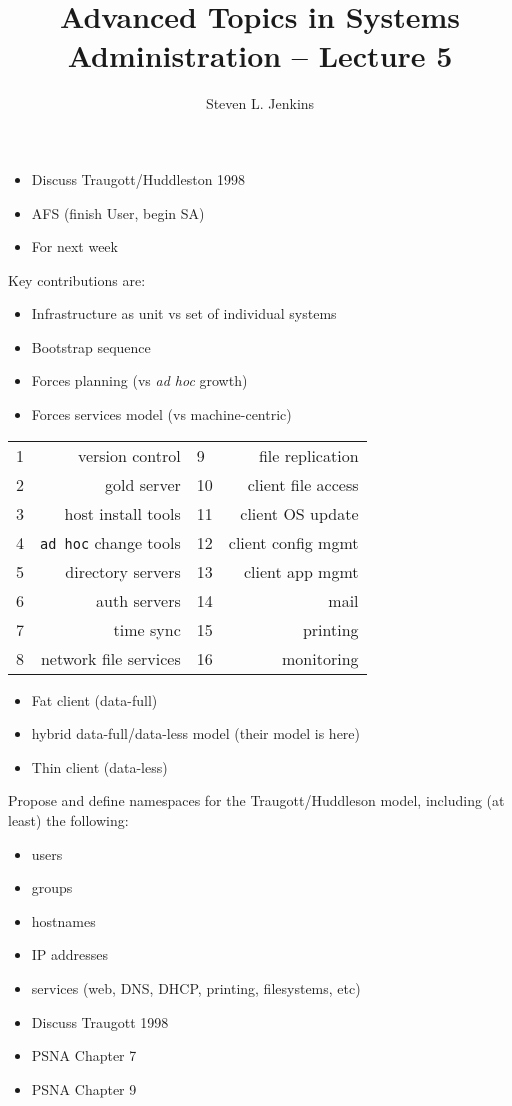 \documentclass{slides}
\title{Advanced Topics in Systems Administration -- Lecture 5}
\author{Steven L. Jenkins}
\newcommand{\bi}{\begin{itemize}}
\newcommand{\ei}{\end{itemize}}
\begin{document}
\maketitle


\bi
\item Discuss Traugott/Huddleston 1998
\item AFS (finish User, begin SA)
\item For next week
\ei


Key contributions are:
\bi
\item Infrastructure as unit vs set of individual systems
\item Bootstrap sequence
\ei


\bi
\item Forces planning (vs {\it ad hoc} growth)
\item Forces services model (vs machine-centric)
\ei


\begin{tabular}{|lr|lr|}
\hline
1 & version control 	& 9 	& file replication \\
2 & gold server 	& 10 	& client file access \\
3 & host install tools	& 11	& client OS update \\
4 & {\tt ad hoc} change tools & 12 & client config mgmt\\
5 & directory servers 	& 13 & client app mgmt\\
6 & auth servers & 14 & mail \\
7 & time sync & 15 & printing \\
8 & network file services & 16 & monitoring \\
\hline
\end{tabular}

\bi
\item Fat client (data-full)
\item hybrid data-full/data-less model (their model is here)
\item Thin client (data-less)
\ei


Propose and define namespaces for the Traugott/Huddleson model, including
(at least) the following:
\bi
\item users
\item groups
\item hostnames
\item IP addresses
\item services (web, DNS, DHCP, printing, filesystems, etc)
\ei


\bi
\item Discuss Traugott 1998
\item PSNA Chapter 7 
\item PSNA Chapter 9
\ei
\end{document}
